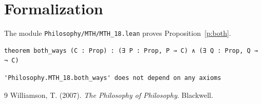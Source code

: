 \documentclass{situationist-preprint}
\begin{document}
\section{Formalization}

The module \nolinkurl{Philosophy/MTH/MTH_18.lean} proves Proposition~\ref{p:both}.

\begin{lstlisting}
theorem both_ways (C : Prop) : (∃ P : Prop, P → C) ∧ (∃ Q : Prop, Q → ¬ C)
\end{lstlisting}

\begin{lstlisting}
'Philosophy.MTH_18.both_ways' does not depend on any axioms
\end{lstlisting}

\begin{thebibliography}{9}\small
{} Williamson, T. (2007). \emph{The Philosophy of Philosophy}. Blackwell.
\end{thebibliography}
\end{document}
